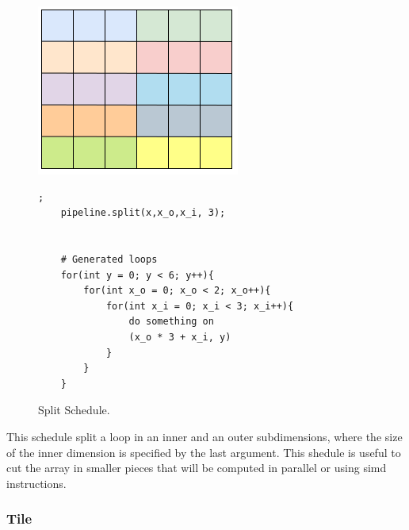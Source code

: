 \begin{figure}[H]

		\begin{minipage}[c]{\EIW}
			\centering
		\includegraphics[width=\textwidth]{Images/Split.png}
		\end{minipage}
		\begin{minipage}[c]{\ECW}
			\centering
			\begin{lstlisting}[label={code:reorder}];
	pipeline.split(x,x_o,x_i, 3);


	# Generated loops
	for(int y = 0; y < 6; y++){
		for(int x_o = 0; x_o < 2; x_o++){
			for(int x_i = 0; x_i < 3; x_i++){
				do something on
				(x_o * 3 + x_i, y)
			}
		}
	}
\end{lstlisting}
		\end{minipage}
		\caption{Split Schedule.}
		\label{schedule:split}
\end{figure}

	This schedule split a loop in an inner and an outer subdimensions, where the size of the inner dimension is specified by the last argument. This shedule is useful to cut the array in smaller pieces that will be computed in parallel or using \gls{simd} instructions.

\subsubsection{Tile}



